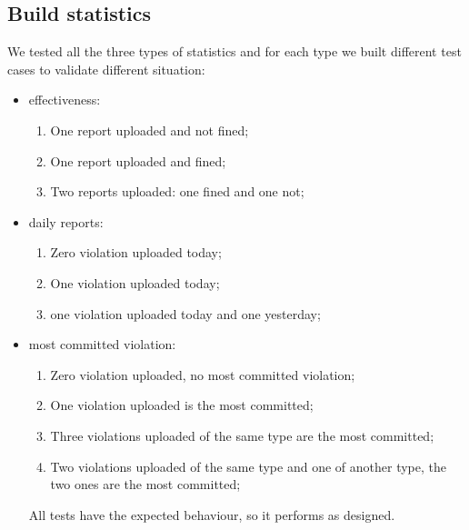 \documentclass[../ITD.tex]{subfiles}
\begin{document}
    \subsection{Build statistics}\label{subsec:build-statistics}
    We tested all the three types of statistics and for each type we built different test cases to validate different situation:
    \begin{itemize}
        \item effectiveness:
        \begin{enumerate}
            \item One report uploaded and not fined;
            \item One report uploaded and fined;
            \item Two reports uploaded: one fined and one not;
        \end{enumerate}
        \item daily reports:
        \begin{enumerate}
            \item Zero violation uploaded today;
            \item One violation uploaded today;
            \item one violation uploaded today and one yesterday;
        \end{enumerate}
        \item most committed violation:
        \begin{enumerate}
            \item Zero violation uploaded, no most committed violation;
            \item One violation uploaded is the most committed;
            \item Three violations uploaded of the same type are the most committed;
            \item Two violations uploaded of the same type and one of another type, the two ones are the most committed;
        \end{enumerate}
        All tests have the expected behaviour, so it performs as designed.
    \end{itemize}
\end{document}
